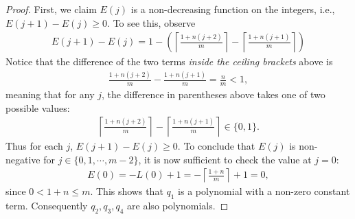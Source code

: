 \documentclass[letterpaper,11pt,reqno]{amsart}
\theoremstyle{plain}
\theoremstyle{definition}
\theoremstyle{remark}
\theoremstyle{remark}
\numberwithin{equation}{section}
\begin{document}
\begin{proof}
First, we claim $E(j)$ is a non-decreasing function on the integers, i.e., $E(j+1) - E(j) \ge 0$. 
To see this, observe
\begin{align*}
E(j+1) - E(j) = 1 - \left( \left\lceil \frac{1+n(j+2)}{m} \right\rceil - \left\lceil \frac{1+n(j+1)}{m} \right\rceil \right)
\end{align*}
Notice that the difference of the two terms {\em inside the ceiling brackets} above is
\begin{align*}
\frac{1+n(j+2)}{m} - \frac{1+n(j+1)}{m} = \frac{n}{m} < 1,
\end{align*}
meaning that for any $j$, the difference in parentheses above takes one of two possible values:
\begin{align*}
\left\lceil \frac{1+n(j+2)}{m} \right\rceil - \left\lceil \frac{1+n(j+1)}{m} \right\rceil \in \{0,1\}.
\end{align*}
Thus for each $j$, $E(j+1) - E(j) \ge 0$.
To conclude that $E(j)$ is non-negative for $j \in  \{0,1,\cdots,m-2\}$, it is now sufficient to check the value at $j=0$:
\begin{align}
E(0) = -L(0) + 1 = -\left\lceil \frac{1+n}{m} \right\rceil + 1 = 0,
\end{align}
since $0 < 1+n \le m$.
This shows that $q_1$ is a polynomial with a non-zero constant term.
Consequently $q_2,q_3,q_4$ are also polynomials.


\end{proof}
\end{document}
